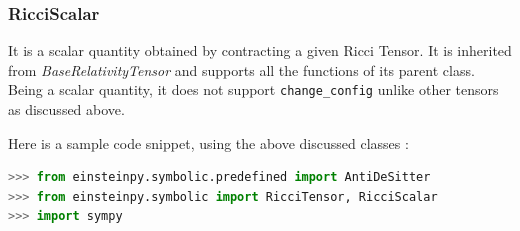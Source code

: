 \documentclass[onecolumn]{aa}
\begin{document}

\subsubsection{RicciScalar}\label{subsubsec:ricciscalar}

It is a scalar quantity obtained by contracting a given Ricci Tensor. It is inherited from \textit{BaseRelativityTensor} and supports all the functions of its parent class. Being a scalar quantity, it does not support \texttt{change\_config} unlike other tensors as discussed above.




Here is a sample code snippet, using the above discussed classes : 

\begin{lstlisting}[language=Python, caption=Importing Anti De-Sitter metric]
>>> from einsteinpy.symbolic.predefined import AntiDeSitter
>>> from einsteinpy.symbolic import RicciTensor, RicciScalar
>>> import sympy
\end{lstlisting}
\end{document}
